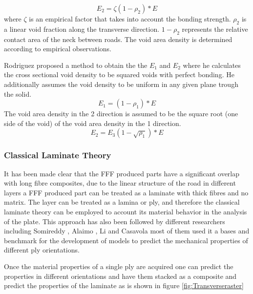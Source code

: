 \begin{equation} \label{eqn:ROMseriesfactor}
E_2=\zeta(1-\rho_2)*E
\end{equation}
where $\zeta$ is an empirical factor that takes into account the bonding strength. $\rho_2$ is a linear void fraction along the transverse direction. $1-\rho_2$  represents the relative contact area of the neck between roads. The void area density is determined according to empirical observations. 

Rodriguez \cite{Rodriguez2003MechanicalModeling} proposed a method to obtain the the $E_1$ and $E_2$ where he calculates the cross sectional void density to be squared voids with perfect bonding. He additionally assumes the void density to be uniform in any given plane trough the solid. 
\begin{equation}\label{eqn:E_1}
E_1=(1-\rho_1)*E
\end{equation}The void area density in the 2 direction is assumed to be the square root (one side of the void) of the void area density in the 1 direction.
\begin{equation}\label{eqn:E_2}
E_2=E_3(1-\sqrt{\rho_1})*E
\end{equation}
\subsubsection{Classical Laminate Theory}
It has been made clear that the FFF produced parts have a significant overlap with long fibre composites, due to the linear structure of the road in different layers a FFF produced part can be treated as a laminate with thick fibres and no matrix. The layer can be treated as a lamina or ply, and therefore the classical laminate theory can be employed to account its material behavior in the analysis of the plate. This approach has also been followed by different researchers including Somireddy \cite{Somireddy2018DevelopmentFDM}\cite{Somireddy2017FlexuralStudy}\cite{Somireddy2017MechanicalMesostructure}, Alaimo \cite{Alaimo2017InfluenceParts}, Li \cite{Li2002CompositeProperties} and Casavola \cite{Casavola2016OrthotropicTheory} most of them used it a bases and benchmark for the development of  models to predict the mechanical properties of different ply orientations.

Once the material properties of a single ply are acquired one can predict the properties in different orientations and have them stacked as a composite and predict the properties of the laminate as is shown in figure \ref{fig:Transverseraster}

